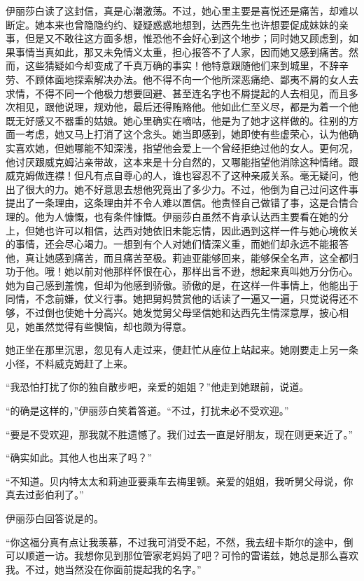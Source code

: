\par 伊丽莎白读了这封信，真是心潮激荡。不过，她心里主要是喜悦还是痛苦，却难以断定。她本来也曾隐隐约约、疑疑惑惑地想到，达西先生也许想要促成妹妹的亲事，但是又不敢往这方面多想，惟恐他不会好心到这个地步；同时她又顾虑到，如果事情当真如此，那又未免情义太重，担心报答不了人家，因而她又感到痛苦。然而，这些猜疑如今却变成了千真万确的事实！他特意跟随他们来到城里，不辞辛劳、不顾体面地探索解决办法。他不得不向一个他所深恶痛绝、鄙夷不屑的女人去求情，不得不同一个他极力想要回避、甚至连名字也不屑提起的人去相见，而且多次相见，跟他说理，规劝他，最后还得贿赂他。他如此仁至义尽，都是为着一个他既无好感又不器重的姑娘。她心里确实在嘀咕，他是为了她才这样做的。往别的方面一考虑，她又马上打消了这个念头。她当即感到，她即使有些虚荣心，认为他确实喜欢她，但她哪能不知深浅，指望他会爱上一个曾经拒绝过他的女人。更何况，他讨厌跟威克姆沾亲带故，这本来是十分自然的，又哪能指望他消除这种情绪。跟威克姆做连襟！但凡有点自尊心的人，谁也容忍不了这种亲戚关系。毫无疑问，他出了很大的力。她不好意思去想他究竟出了多少力。不过，他倒为自己过问这件事提出了一条理由，这条理由并不令人难以置信。他责怪自己做错了事，这是合情合理的。他为人慷慨，也有条件慷慨。伊丽莎白虽然不肯承认达西主要看在她的分上，但她也许可以相信，达西对她依旧未能忘情，因此遇到这样一件与她心境攸关的事情，还会尽心竭力。一想到有个人对她们情深义重，而她们却永远不能报答他，真让她感到痛苦，而且痛苦至极。莉迪亚能够回来，能够保全名声，这全都归功于他。哦！她以前对他那样怀恨在心，那样出言不逊，想起来真叫她万分伤心。她为自己感到羞愧，但却为他感到骄傲。骄傲的是，在这样一件事情上，他能出于同情，不念前嫌，仗义行事。她把舅妈赞赏他的话读了一遍又一遍，只觉说得还不够，不过倒也使她十分高兴。她发觉舅父母坚信她和达西先生情深意厚，披心相见，她虽然觉得有些懊恼，却也颇为得意。
\par 她正坐在那里沉思，忽见有人走过来，便赶忙从座位上站起来。她刚要走上另一条小径，不料威克姆赶了上来。
\par “我恐怕打扰了你的独自散步吧，亲爱的姐姐？”他走到她跟前，说道。
\par “的确是这样的，”伊丽莎白笑着答道。“不过，打扰未必不受欢迎。”
\par “要是不受欢迎，那我就不胜遗憾了。我们过去一直是好朋友，现在则更亲近了。”
\par “确实如此。其他人也出来了吗？”
\par “不知道。贝内特太太和莉迪亚要乘车去梅里顿。亲爱的姐姐，我听舅父母说，你真去过彭伯利了。”
\par 伊丽莎白回答说是的。
\par “你这福分真有点让我羡慕，不过我可消受不起，不然，我去纽卡斯尔的途中，倒可以顺道一访。我想你见到那位管家老妈妈了吧？可怜的雷诺兹，她总是那么喜欢我。不过，她当然没在你面前提起我的名字。”
